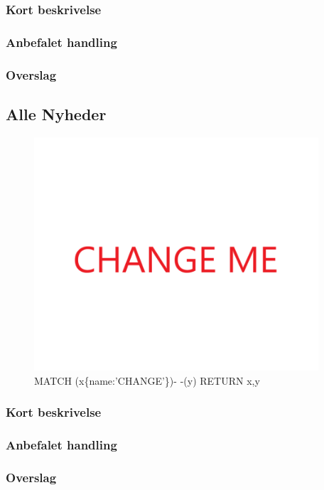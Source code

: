 \documentclass{article}
\begin{document}
\subsubsection{Kort beskrivelse}
\subsubsection{Anbefalet handling}
\subsubsection{Overslag}
\subsection{Alle Nyheder}
\begin{figure}[h]
\includegraphics[width=300pt]{CHANGE.PNG}
\caption{MATCH (x\{name:'CHANGE'\})- -(y) RETURN x,y}
\end{figure}
\subsubsection{Kort beskrivelse}
\subsubsection{Anbefalet handling}
\subsubsection{Overslag}
\newpage{}
\clearpage
\end{document}
